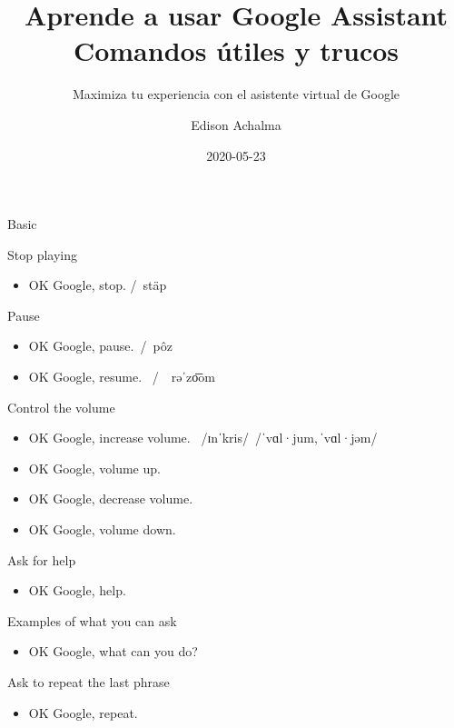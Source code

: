 \documentclass[
  letterpaper,
  DIV=11,
  numbers=noendperiod]{scrartcl}
\title{Aprende a usar Google Assistant Comandos útiles y trucos}
\subtitle{Maximiza tu experiencia con el asistente virtual de Google}
\author{Edison Achalma}
\date{2020-05-23}
\providecommand{\tightlist}{%
  \setlength{\itemsep}{0pt}\setlength{\parskip}{0pt}}\usepackage{longtable,booktabs,array}
\begin{document}
\maketitle
\ifdefined\Shaded\renewenvironment{Shaded}{\begin{tcolorbox}[boxrule=0pt, enhanced, interior hidden, frame hidden, borderline west={3pt}{0pt}{shadecolor}, breakable, sharp corners]}{\end{tcolorbox}}\fi

Basic

Stop playing

\begin{itemize}
\tightlist
\item
  OK Google, stop. /~stäp
\end{itemize}

Pause

\begin{itemize}
\tightlist
\item
  OK Google, pause.~/~pôz
\item
  OK Google, resume.~ /~~rəˈzo͞om
\end{itemize}

Control the volume

\begin{itemize}
\tightlist
\item
  OK Google, increase volume.~ /ɪnˈkris/ \,/ˈvɑl·jum,\,ˈvɑl·jəm/
\item
  OK Google, volume up.
\item
  OK Google, decrease volume.
\item
  OK Google, volume down.
\end{itemize}

Ask for help

\begin{itemize}
\tightlist
\item
  OK Google, help.
\end{itemize}

Examples of what you can ask

\begin{itemize}
\tightlist
\item
  OK Google, what can you do?
\end{itemize}

Ask to repeat the last phrase

\begin{itemize}
\tightlist
\item
  OK Google, repeat.
\end{itemize}
\end{document}
